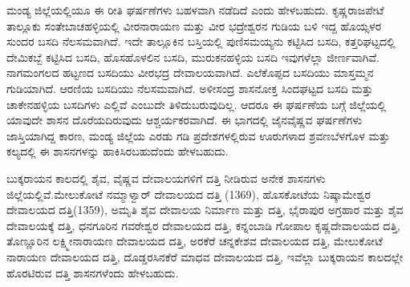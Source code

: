 ಮಂಡ್ಯ ಜಿಲ್ಲೆಯಲ್ಲಿಯೂ ಈ ರೀತಿ ಘರ್ಷಣೆಗಳು ಬಹಳವಾಗಿ ನಡೆದಿದೆ ಎಂದು ಹೇಳಬಹುದು. ಕೃಷ್ಣರಾಜಪೇಟೆ ತಾಲ್ಲೂಕು ಸಂತೇಬಾಚಹಳ್ಳಿಯಲ್ಲಿ ವೀರನಾರಾಯಣ ಮತ್ತು ವೀರ ಭದ್ರೇಶ್ವರನ ಗುಡಿಯ ಬಳಿ ಇದ್ದ ಹೊಯ್ಸಳರ ಸುಂದರ ಬಸದಿ ನೆಲಸಮವಾಗಿದೆ. ಇದೇ ತಾಲ್ಲೂಕಿನ ಬಸ್ತಿಯಲ್ಲಿ ಪುಣಿಸಮಯ್ಯನು ಕಟ್ಟಿಸಿದ ಬಸದಿ, ಕತ್ತರಿಘಟ್ಟದಲ್ಲಿ ದೇಮಿಕಬ್ಬೆ ಕಟ್ಟಿಸಿದ ಬಸದಿ, ಹೊಸಹೊಳಲಿನ ಬಸದಿ, ಮುರುಕನಹಳ್ಳಿಯ ಬಸದಿ ಇವುಗಳೆಲ್ಲಾ ಜೀರ್ಣವಾಗಿವೆ. ನಾಗಮಂಗಲದ ಹಟ್ಟಣದ ಬಸದಿಯು ವೀರಭದ್ರ ದೇವಾಲಯವಾಗಿದೆ. ಎಲೆಕೊಪ್ಪದ ಬಸದಿಯು ಮಾಸ್ತಮ್ಮನ ಗುಡಿಯಾಗಿದೆ. ಆರಣಿಯ ಬಸದಿಯು ನೆಲಸಮವಾಗಿದೆ.\- ಅಳೀಸಂದ್ರ ಶಾಸನೋಕ್ತ ಸಿಂದಘಟ್ಟದ ಬಸದಿ ಮತ್ತು ಚಾಕೇನಹಳ್ಳಿಯ ಬಸದಿಗಳು ಎಲ್ಲಿವೆ ಎಂಬುದೇ ತಿಳಿದುಬರುವುದಿಲ್ಲ. ಆದರೂ ಈ ಘರ್ಷಣೆಯ ಬಗ್ಗೆ ಜಿಲ್ಲೆಯಲ್ಲಿ ಯಾವುದೇ ಶಾಸನ ದೊರೆಯದಿರುವುದು ಆಶ್ಚರ್ಯಕರವಾಗಿದೆ. ಈ ಭಾಗದಲ್ಲಿ ಜೈನ\enginline{-}ವೈಷ್ಣವ ಘರ್ಷಣೆಗಳು ಜಾಸ್ತಿಯಾಗಿದ್ದ ಕಾರಣ, ಮಂಡ್ಯ ಜಿಲ್ಲೆಯ ಎರಡು ಗಡಿ ಪ್ರದೇಶಗಳಲ್ಲಿರುವ ಊರುಗಳಾದ ಶ್ರವಣಬೆಳಗೊಳ ಮತ್ತು ಕಲ್ಯದಲ್ಲಿ ಈ ಶಾಸನಗಳನ್ನು ಹಾಕಿಸಿರಬಹುದೆಂದು ಹೇಳಬಹುದು.

ಬುಕ್ಕರಾಯನ ಕಾಲದಲ್ಲಿ ಶೈವ, ವೈಷ್ಣವ ದೇವಾಲಯಗಳಿಗೆ ದತ್ತಿ ನೀಡಿರುವ ಅನೇಕ ಶಾಸನಗಳು ಜಿಲ್ಲೆಯಲ್ಲಿವೆ.\break ಮೇಲುಕೋಟೆ ನಮ್ಮಾಳ್ವಾರ್​ ದೇವಾಲಯದ ದತ್ತಿ (1369), ಹೊಸಕೋಟೆಯ ನಿಷ್ಕಾಮೇಶ್ವರ ದೇವಾಲಯದ ದತ್ತಿ(1359), ಅಮೃತಿ ಶೈವ ದೇವಾಲಯ ನಿರ್ಮಾಣ ಮತ್ತು ದತ್ತಿ, ಭೈರಾಪುರ ಅಗ್ರಹಾರ ಮತ್ತು ಶೈವ ದೇವಾಲಯಕ್ಕೆ ದತ್ತಿ, ಧನಗೂರಿನ ಗವರೇಶ್ವರ ದೇವಾಲಯದ ದತ್ತಿ, ಕನ್ನಂಬಾಡಿ ಗೋಪಾಲ ಕೃಷ್ಣದೇವಾಲಯದ ದತ್ತಿ, ತೊಣ್ಣೂರಿನ ಲಕ್ಷ್ಮೀನಾರಾಯಣ ದೇವಾಲಯದ ದತ್ತಿ, ಅರಕೆರೆ ಚನ್ನಕೇಶವ ದೇವಾಲಯದ ದತ್ತಿ, ಮೇಲುಕೋಟೆ ನಾರಾಯಣ ದೇವಾಲಯದ ದತ್ತಿ, ದೊಡ್ಡರಸಿನಕೆರೆ ಮಾಧವ ದೇವಾಲಯದ ದತ್ತಿ, ಇವೆಲ್ಲಾ ಬುಕ್ಕರಾಯನ ಕಾಲದಲ್ಲೇ ಹೊರಟಿರುವ ದತ್ತಿ ಶಾಸನಗಳೆಂದು ಹೇಳಬಹುದು.

